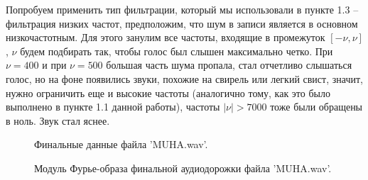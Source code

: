 \documentclass[a5paper, 10pt]{article}
\theoremstyle{definition}
\theoremstyle{plain}
\theoremstyle{remark}
\begin{document}
\newpage
Попробуем применить тип фильтрации, который мы использовали в пункте 1.3 -- фильтрация низких частот, предположим, что шум в записи является в основном низкочастотным. Для этого занулим все частоты, входящие в промежуток $[-\nu, \nu]$, $\nu$ будем подбирать так, чтобы голос был слышен максимально четко. При $\nu = 400$ и при $\nu = 500$ большая часть шума пропала, стал отчетливо слышаться голос, но на фоне появились звуки, похожие на свирель или легкий свист, значит, нужно ограничить еще и высокие частоты (аналогично тому, как это было выполнено в пункте 1.1 данной работы), частоты $|\nu| > 7000$ тоже были обращены в ноль. Звук стал яснее.


\begin{figure}[h!]
\caption{Финальные данные файла 'MUHA.wav'.}
\end{figure}


\begin{figure}[h!]
\caption{Модуль Фурье-образа финальной аудиодорожки файла 'MUHA.wav'.}
\end{figure}
\end{document}

